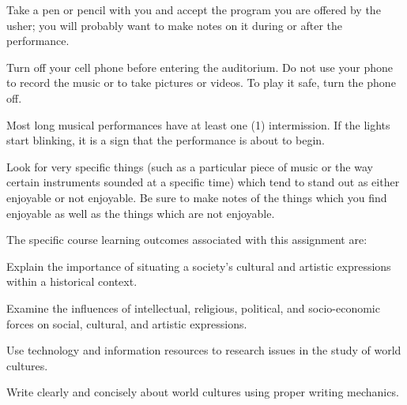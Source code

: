 \begin{enumerate*}
\begin{itemize*}
			\item Take a pen or pencil with you and accept the program you are offered by the usher; you will probably want to make notes on it during or after the performance.
			\item Turn off your cell phone before entering the auditorium. Do not use your phone to record the music or to take pictures or videos. To play it safe, turn the phone off.
			\item Most long musical performances have at least one (1) intermission. If the lights start blinking, it is a sign that the performance is about to begin.
			\item Look for very specific things (such as a particular piece of music or the way certain instruments sounded at a specific time) which tend to stand out as either enjoyable or not enjoyable. Be sure to make notes of the things which you find enjoyable as well as the things which are not enjoyable.
		\end{itemize*}
\end{enumerate*}

The specific course learning outcomes associated with this assignment are:
\begin{itemize*}
	\item Explain the importance of situating a society's cultural and artistic expressions within a historical context.
	\item Examine the influences of intellectual, religious, political, and socio-economic forces on social, cultural, and artistic expressions.
	\item Use technology and information resources to research issues in the study of world cultures.
	\item Write clearly and concisely about world cultures using proper writing mechanics.
\end{itemize*}


